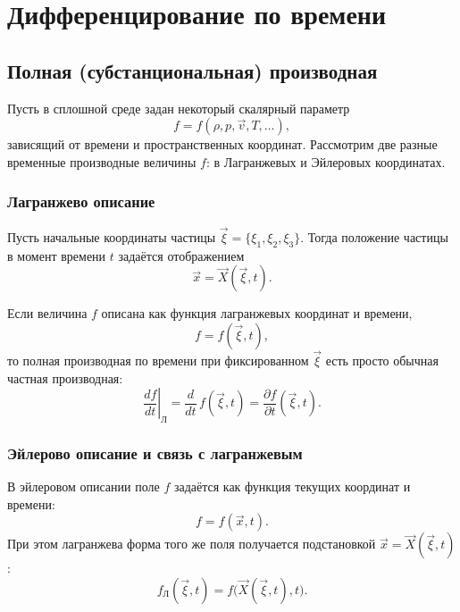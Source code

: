 



\section{Дифференцирование по времени}
\subsection{Полная (субстанциональная) производная}

Пусть в сплошной среде задан некоторый скалярный параметр
\[
  f = f(\rho, p, \vec{v}, T,\dots ),
\]
зависящий от времени и пространственных координат. Рассмотрим две разные
временные производные величины \(f\): в Лагранжевых и Эйлеровых координатах.

\subsubsection*{Лагранжево описание}
Пусть начальные координаты частицы $\vec{\xi} = \{\xi_1, \xi_2, \xi_3\}$. Тогда положение частицы в момент времени \(t\) задаётся отображением
\[
  \vec{x} = \vec{X}(\vec{\xi}, t).
\]

Если величина \(f\) описана как функция лагранжевых координат и
времени,
\[
  f = f(\vec{\xi}, t),
\]
то полная производная по времени при фиксированном
\(\vec{\xi}\) есть просто обычная частная производная:
\[
  \left.\frac{df}{dt}\right|_{\text{Л}} 
    = \frac{d}{dt}\, f(\vec{\xi}, t)
    = \frac{\partial f}{\partial t}(\vec{\xi}, t).
\]

\subsubsection*{Эйлерово описание и связь с лагранжевым}

В эйлеровом описании поле \(f\) задаётся как функция текущих
координат и времени:
\[
  f = f(\vec{x}, t).
\]
При этом лагранжева форма того же поля получается подстановкой
\(\vec{x} = \vec{X}(\vec{\xi}, t)\):
\[
  f_{\text{Л}}(\vec{\xi}, t)
    = f\bigl(\vec{X}(\vec{\xi}, t), t\bigr).
\]

\begin{figure}[h]
  \centering
\end{figure}

